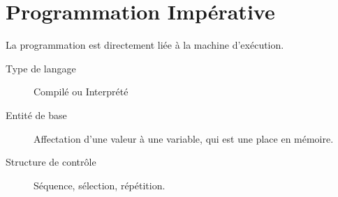 	\section{Programmation Impérative}\label{imperative}
		La programmation est directement liée à la machine d'exécution.
		\begin{description}	
			\item[Type de langage] Compilé ou Interprété
			\item[Entité de base] Affectation d'une valeur à une variable, qui est une place en mémoire.
			\item[Structure de contrôle] Séquence, sélection, répétition.
		\end{description}

